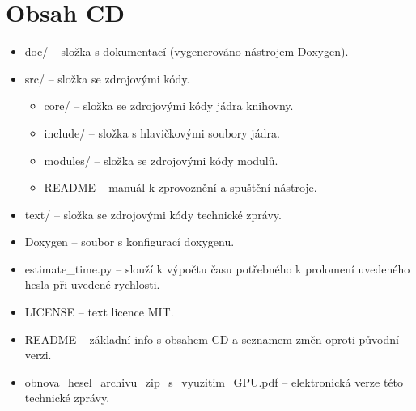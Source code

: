 \chapter{Obsah CD}
\begin{itemize}
    \item doc/ -- složka s dokumentací (vygenerováno nástrojem Doxygen).
    \item src/ -- složka se zdrojovými kódy.
	\begin{itemize}
	    \item core/ -- složka se zdrojovými kódy jádra knihovny.
	    \item include/ -- složka s hlavičkovými soubory jádra.
	    \item modules/ -- složka se zdrojovými kódy modulů.
	    \item README -- manuál k zprovoznění a spuštění nástroje.
	\end{itemize}
    \item text/ -- složka se zdrojovými kódy technické zprávy.
    \item Doxygen -- soubor s konfigurací doxygenu.
    \item estimate\_time.py -- slouží k výpočtu času potřebného k prolomení uvedeného hesla při
	uvedené rychlosti.
    \item LICENSE -- text licence MIT.
    \item README -- základní info s obsahem CD a seznamem změn oproti původní verzi.
    \item obnova\_hesel\_archivu\_zip\_s\_vyuzitim\_GPU.pdf -- elektronická verze této technické zprávy.
\end{itemize}
